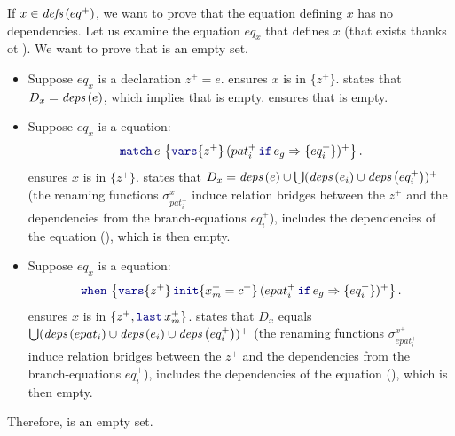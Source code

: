 \begin{skippableproof}
\begin{itemize}
              If $x \in {\ensuremath{\textit{defs}\left(eq^+\right)}}$, we want to prove that the equation defining $x$ has no dependencies.
              Let us examine the equation $eq_x$ that defines $x$ (that exists thanks ot
              ). We want to prove that  is
              an empty set.
              \begin{itemize}
                  \item Suppose $eq_x$ is a declaration $z^+ = e$.
                         ensures $x$ is in
                        $\{z^+\}$.
                         states that
                        $D_x = {\textit{deps}\left(e\right)}$, which implies that  is empty.
                         ensures that
                         is empty.
                  \item Suppose $eq_x$ is a  equation:
                        $$\match{e}{z^+}{(\branch{pat_i^+}{e_g}{eq_i^+})^+}.$$
                         ensures $x$ is in
                        $\{z^+\}$. 
                        states that $D_x = {\textit{deps}\left(e\right)} \cup \bigcup ({\textit{deps}\left(e_i\right)} \cup {\ensuremath{\textit{deps}\left(eq_i^+\right)}})^+$
                        (the renaming functions $\sigma^{x^+}_{pat_i^+}$ induce relation bridges between
                        the $z^+$ and the dependencies from the branch-equations $eq_i^+$), includes
                        the dependencies of the  equation (), which is then empty.
                  \item Suppose $eq_x$ is a  equation:
                        $$\when{z^+}{x_m^+ = c^+}{(\branch{epat_i^+}{e_g}{eq_i^+})^+}.$$
                         ensures $x$ is in
                        $\{z^+, \last{x_m}^+\}$.  states that $D_x$ equals $\bigcup ({\textit{deps}\left(epat_i\right)} \cup
                            {\ensuremath{\textit{deps}\left(e_i\right)}} \cup {\ensuremath{\textit{deps}\left(eq_i^+\right)}})^+$ (the renaming functions
                        $\sigma^{x^+}_{epat_i^+}$ induce relation bridges between the $z^+$ and the
                        dependencies from the branch-equations $eq_i^+$), includes the dependencies
                        of the  equation (), which is then empty.
              \end{itemize}
              Therefore,  is an empty set.


\end{itemize}
\end{skippableproof}
